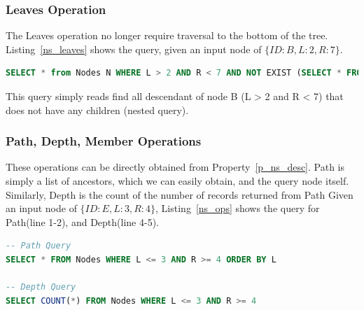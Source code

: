 \subsubsection{Leaves Operation}

The Leaves operation no longer require traversal to the bottom of the tree. Listing~\ref{ns_leaves} shows the query, given an input node of $\{ID:B, L:2, R:7\}$.

\begin{lstlisting}[language=sql,caption={Nested Sets Leaves Operation},label=ns_leaves]
SELECT * from Nodes N WHERE L > 2 AND R < 7 AND NOT EXIST (SELECT * FROM Nodes WHERE Parent=N.ID) 
\end{lstlisting}

This query simply reads find all descendant of node B (L > 2 and R < 7) that does not have any children (nested query).

\subsubsection{Path, Depth, Member Operations}

These operations can be directly obtained from Property~\ref{p_ns_desc}. Path is simply a list of ancestors, which we can easily obtain, and the query node itself. Similarly, Depth is the count of the number of records returned from Path Given an input node of $\{ID:E, L:3, R:4\}$, Listing~\ref{ns_ops} shows the query for Path(line 1-2), and Depth(line 4-5).

\begin{lstlisting}[language=sql,caption={Path, Depth, Member Operations},label=ns_ops]
-- Path Query
SELECT * FROM Nodes WHERE L <= 3 AND R >= 4 ORDER BY L

-- Depth Query
SELECT COUNT(*) FROM Nodes WHERE L <= 3 AND R >= 4
\end{lstlisting}




